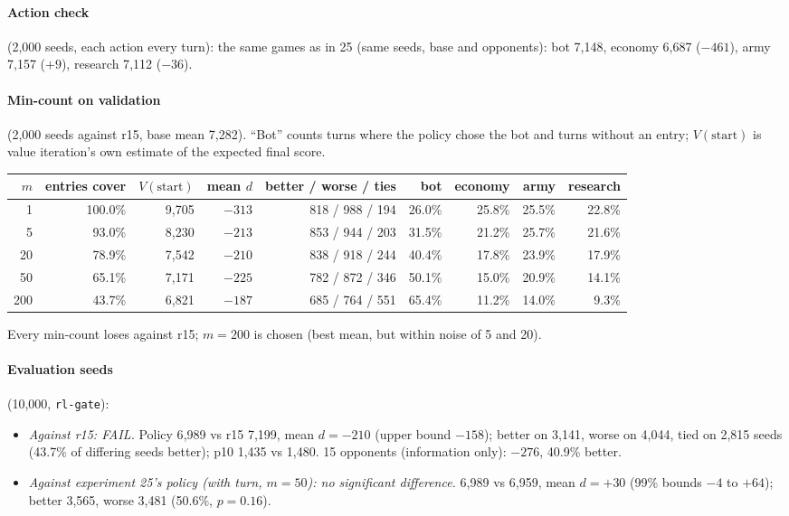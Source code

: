 \documentclass{../polyexp}
\begin{document}
\paragraph{Action check} (2{,}000 seeds, each action every turn): the same games as in 25 (same seeds, base and
opponents): bot 7{,}148, economy 6{,}687 ($-461$), army 7{,}157 ($+9$), research 7{,}112 ($-36$).

\paragraph{Min-count on validation} (2{,}000 seeds against r15, base mean 7{,}282). ``Bot'' counts turns where the
policy chose the bot and turns without an entry; $V(\text{start})$ is value iteration's own estimate of the expected
final score.

\begin{center}\small
\begin{tabular}{rrrrrrrrr}
\toprule
$m$ & entries cover & $V(\text{start})$ & mean $d$ & better / worse / ties & bot & economy & army & research \\
\midrule
1   & 100.0\% & 9{,}705 & $-313$ & 818 / 988 / 194 & 26.0\% & 25.8\% & 25.5\% & 22.8\% \\
5   & 93.0\%  & 8{,}230 & $-213$ & 853 / 944 / 203 & 31.5\% & 21.2\% & 25.7\% & 21.6\% \\
20  & 78.9\%  & 7{,}542 & $-210$ & 838 / 918 / 244 & 40.4\% & 17.8\% & 23.9\% & 17.9\% \\
50  & 65.1\%  & 7{,}171 & $-225$ & 782 / 872 / 346 & 50.1\% & 15.0\% & 20.9\% & 14.1\% \\
200 & 43.7\%  & 6{,}821 & $-187$ & 685 / 764 / 551 & 65.4\% & 11.2\% & 14.0\% & 9.3\% \\
\bottomrule
\end{tabular}
\end{center}

Every min-count loses against r15; $m = 200$ is chosen (best mean, but within noise of 5 and 20).

\paragraph{Evaluation seeds} (10{,}000, \texttt{rl-gate}):
\begin{itemize}
  \item \emph{Against r15: FAIL.} Policy 6{,}989 vs r15 7{,}199, mean $d = -210$ (upper bound $-158$); better on
        3{,}141, worse on 4{,}044, tied on 2{,}815 seeds (43.7\% of differing seeds better); p10 1{,}435 vs
        1{,}480. 15 opponents (information only): $-276$, 40.9\% better.
  \item \emph{Against experiment 25's policy (with turn, $m = 50$): no significant difference.} 6{,}989 vs 6{,}959,
        mean $d = +30$ (99\% bounds $-4$ to $+64$); better 3{,}565, worse 3{,}481 (50.6\%, $p = 0.16$).
\end{itemize}
\end{document}
